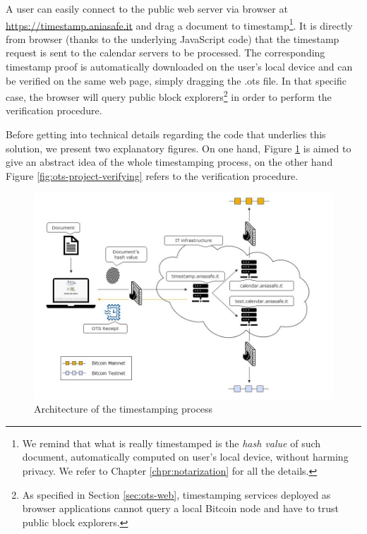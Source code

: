 \bigskip
\noindent
A user can easily connect to the public web server via browser at \url{https://timestamp.aniasafe.it} and drag a document to timestamp\footnote{We remind that what is really timestamped is the \textit{hash value} of such document, automatically computed on user's local device, without harming privacy. We refer to Chapter \ref{chpr:notarization} for all the details.}. It is directly from browser (thanks to the underlying JavaScript code) that the timestamp request is sent to the calendar servers to be processed. The corresponding timestamp proof is automatically downloaded on the user's local device and can be verified on the same web page, simply dragging the \colorbox{light-gray}{.ots} file. In that specific case, the browser will query public block explorers\footnote{As specified in Section \ref{sec:ots-web}, timestamping services deployed as browser applications cannot query a local Bitcoin node and have to trust public block explorers.} in order to perform the verification procedure. 

\bigskip
\noindent
Before getting into technical details regarding the code that underlies this solution, we present two explanatory figures. On one hand, Figure \ref{fig:ots-project-stamping} is aimed to give an abstract idea of the whole timestamping process, on the other hand Figure \ref{fig:ots-project-verifying} refers to the verification procedure.

\begin{figure}[ht]
    \centering
	\includegraphics[width=1\linewidth]{Images/project-stamping.jpg}
	\caption{Architecture of the timestamping process}
	\label{fig:ots-project-stamping}
\end{figure}

